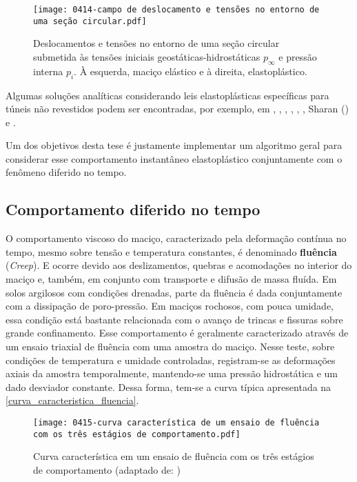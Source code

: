 \begin{figure}[H]
	\begin{center}
		\texttt{[image: 0414-campo de deslocamento e tensões no entorno de uma seção circular.pdf]}
	\end{center}
	\caption{\label{deslocamentos_tensoes_analitico}Deslocamentos e tensões no entorno de uma seção circular submetida às tensões iniciais geostáticas-hidrostáticas $p_{\infty}$ e pressão interna $p_i$. À esquerda, maciço elástico e à direita, elastoplástico.}
\end{figure}

Algumas soluções analíticas considerando leis elastoplásticas específicas para túneis não revestidos podem ser encontradas, por exemplo, em , , , , , , Sharan (\citeyear{Sharan2003,Sharan2005}) e .

Um dos objetivos desta tese é justamente implementar um algoritmo geral para considerar esse comportamento instantâneo elastoplástico conjuntamente com o fenômeno diferido no tempo.

\subsection{Comportamento diferido no tempo}

O comportamento viscoso do maciço, caracterizado pela deformação contínua no tempo, mesmo sobre tensão e temperatura constantes, é denominado \textbf{fluência} (\textit{Creep}). E ocorre devido aos deslizamentos, quebras e acomodações no interior do maciço e, também, em conjunto com transporte e difusão de massa fluída. Em solos argilosos com condições drenadas, parte da fluência é dada conjuntamente com a dissipação de poro-pressão. Em maciços rochosos, com pouca umidade, essa condição está bastante relacionada com o avanço de trincas e fissuras sobre grande confinamento. Esse comportamento é geralmente caracterizado através de um ensaio triaxial de fluência com uma amostra do maciço. Nesse teste, sobre condições de temperatura e umidade controladas, registram-se as deformações axiais da amostra temporalmente, mantendo-se uma pressão hidrostática e um dado desviador constante. Dessa forma, tem-se a curva típica apresentada na \autoref{curva_caracteristica_fluencia}.

\begin{figure}[H]
	\begin{center}
		\texttt{[image: 0415-curva característica de um ensaio de fluência com os três estágios de comportamento.pdf]}
	\end{center}
	\caption{\label{curva_caracteristica_fluencia}Curva característica em um ensaio de fluência com os três estágios de comportamento (adaptado de: )}
\end{figure}

